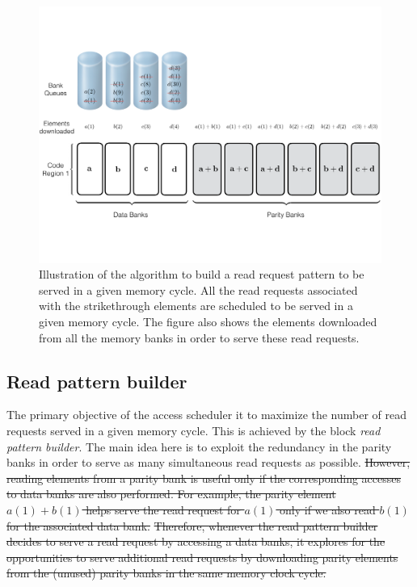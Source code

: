\begin{figure}[htbp]
	\centering
	\includegraphics[width=0.96\linewidth]{fig/Read-Algo-Example.pdf}
	\caption{{Illustration of the algorithm to build a read request pattern to be served in a given memory cycle. All the read requests associated with the strikethrough elements are scheduled to be served in a given memory cycle. The figure also shows the elements downloaded from all the memory banks in order to serve these read requests.}}
	\label{fig:readAlgoAccessPattern}
\end{figure}
\subsection{Read pattern builder}
\label{sec:readCodingAlgo}
The primary objective of the access scheduler it to maximize the number of read requests served in a given memory cycle. This is achieved by the block {\em read pattern builder}. The main idea here is to exploit the redundancy in the parity banks in order to serve as many simultaneous read requests as possible. \sout{However, reading elements from a parity bank is useful only if the corresponding accesses to data banks are also performed. For example, the parity element $a(1) + b(1)$ helps serve the read request for $a(1)$ only if we also read $b(1)$ for the associated data bank.} {\color{red} \sout{Therefore, whenever the read pattern builder decides to serve a read request by accessing a data banks, it explores for the opportunities to serve additional read requests by downloading parity elements from the (unused) parity banks in the same memory clock cycle.}}

